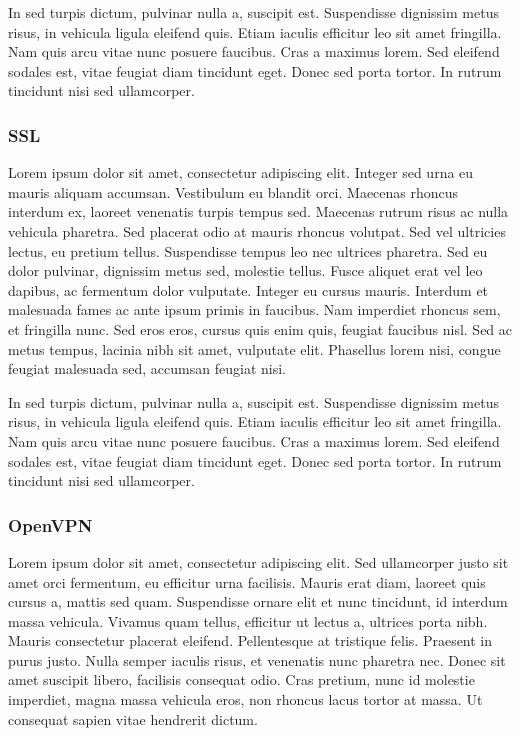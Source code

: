 \documentclass[a4paper,12pt]{report}
\begin{document}
In sed turpis dictum, pulvinar nulla a, suscipit est. Suspendisse dignissim metus risus, in vehicula ligula eleifend quis. Etiam iaculis efficitur leo sit amet fringilla. Nam quis arcu  vitae nunc posuere faucibus. Cras a maximus lorem. Sed eleifend sodales est, vitae feugiat diam tincidunt eget. Donec sed porta tortor. In rutrum tincidunt nisi sed ullamcorper.

\subsubsection{SSL}  %
Lorem ipsum dolor sit amet, consectetur adipiscing elit. Integer sed urna eu mauris aliquam accumsan. Vestibulum eu blandit orci. Maecenas rhoncus interdum ex, laoreet venenatis turpis tempus sed. Maecenas rutrum risus ac nulla vehicula pharetra. Sed placerat odio at mauris rhoncus volutpat. Sed vel ultricies lectus, eu pretium tellus. Suspendisse tempus leo nec ultrices pharetra. Sed eu dolor pulvinar, dignissim metus sed, molestie tellus. Fusce aliquet erat vel leo dapibus, ac fermentum dolor vulputate. Integer eu cursus mauris. Interdum et malesuada fames ac ante ipsum primis in faucibus. Nam imperdiet rhoncus sem, et fringilla nunc. Sed eros eros, cursus quis enim quis, feugiat faucibus nisl. Sed ac metus tempus, lacinia nibh sit amet, vulputate elit. Phasellus lorem nisi, congue feugiat malesuada sed, accumsan feugiat nisi.

In sed turpis dictum, pulvinar nulla a, suscipit est. Suspendisse dignissim metus risus, in vehicula ligula eleifend quis. Etiam iaculis efficitur leo sit amet fringilla. Nam quis arcu vitae nunc posuere faucibus. Cras a maximus lorem. Sed eleifend sodales est, vitae feugiat diam tincidunt eget. Donec sed porta tortor. In rutrum tincidunt nisi sed ullamcorper.

\subsubsection{OpenVPN}   %
Lorem ipsum dolor sit amet, consectetur adipiscing elit. Sed ullamcorper justo sit amet orci fermentum, eu efficitur urna facilisis. Mauris erat diam, laoreet quis cursus a, mattis sed quam. Suspendisse ornare elit et nunc tincidunt, id interdum massa vehicula. Vivamus quam tellus, efficitur ut lectus a, ultrices porta nibh. Mauris consectetur placerat eleifend. Pellentesque at tristique felis. Praesent in purus justo. Nulla semper iaculis risus, et venenatis nunc pharetra nec. Donec sit amet suscipit libero, facilisis consequat odio. Cras pretium, nunc id molestie imperdiet, magna massa vehicula eros, non rhoncus lacus tortor at massa. Ut consequat sapien vitae hendrerit dictum.
\end{document}
